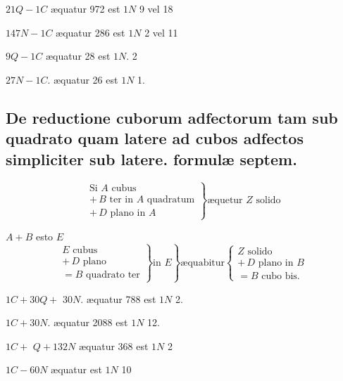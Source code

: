 \documentclass[11pt,a4paper]{article}
\begin{document}
$21Q - 1C$ æquatur 972 est $1N$ 9 vel 18

$147N - 1C$ æquatur 286 est $1N$ 2 vel 11

$9Q - 1C$ æquatur 28 est $1N$. 2

$27N - 1C$. æquatur 26 est $1N$ 1.

\subsection*{De reductione cuborum adfectorum tam sub quadrato quam latere ad cubos adfectos simpliciter sub latere. formulæ septem.}

\[ \left. \begin{array}{l} \text{Si } A \text{ cubus} \\ +\,B \text{ ter in } A \text{ quadratum} \\ +\,D \text{ plano in } A \end{array} \right\} \text{æquetur } Z \text{ solido} \]

$A + B$ esto $E$
\[ \left. \left. \begin{array}{l} E \text{ cubus} \\ +\,D \text{ plano} \\ = B \text{ quadrato ter} \end{array} \right\} \text{in } E \right\} \text{æquabitur} \left\{ \begin{array}{l} Z \text{ solido} \\ +\,D \text{ plano in } B \\ = B \text{ cubo bis.} \end{array} \right. \]

$1C + 30Q +$ $30N$. æquatur 788 est $1N$ 2.

$1C + 30N$. æquatur 2088 est $1N$ 12.

$1C +$ $Q + 132N$ æquatur 368 est $1N$ 2

$1C - 60N$ æquatur  est $1N$ 10
\end{document}
